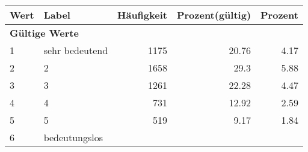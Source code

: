      \begin{longtable}{lXrrr}
     \toprule
     \textbf{Wert} & \textbf{Label} & \textbf{Häufigkeit} & \textbf{Prozent(gültig)} & \textbf{Prozent} \\
     \endhead
     \midrule
     \multicolumn{5}{l}{\textbf{Gültige Werte}}\\

     1 &
     \multicolumn{1}{X}{ sehr bedeutend   } &


       \num{1175} &
       \num[round-mode=places,round-precision=2]{20,76} &
         \num[round-mode=places,round-precision=2]{4,17} \\

     2 &
     \multicolumn{1}{X}{ 2   } &


       \num{1658} &
       \num[round-mode=places,round-precision=2]{29,3} &
         \num[round-mode=places,round-precision=2]{5,88} \\

     3 &
     \multicolumn{1}{X}{ 3   } &


       \num{1261} &
       \num[round-mode=places,round-precision=2]{22,28} &
         \num[round-mode=places,round-precision=2]{4,47} \\

     4 &
     \multicolumn{1}{X}{ 4   } &


       \num{731} &
       \num[round-mode=places,round-precision=2]{12,92} &
         \num[round-mode=places,round-precision=2]{2,59} \\

     5 &
     \multicolumn{1}{X}{ 5   } &


       \num{519} &
       \num[round-mode=places,round-precision=2]{9,17} &
         \num[round-mode=places,round-precision=2]{1,84} \\

     6 &
     \multicolumn{1}{X}{ bedeutungslos   } &



\end{longtable}
